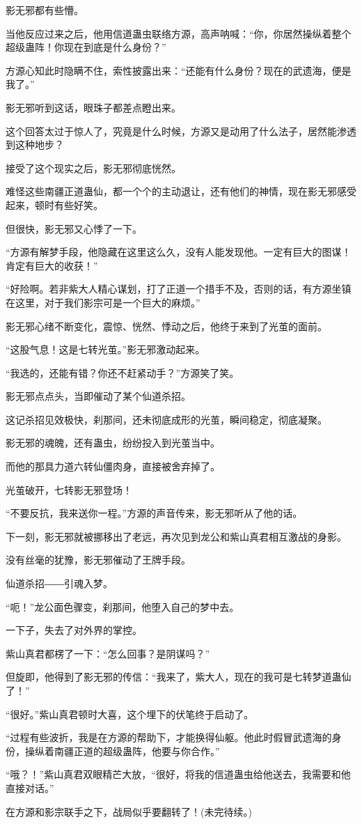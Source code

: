 \begin{this_body}
影无邪都有些懵。

当他反应过来之后，他用信道蛊虫联络方源，高声呐喊：“你，你居然操纵着整个超级蛊阵！你现在到底是什么身份？”

方源心知此时隐瞒不住，索性披露出来：“还能有什么身份？现在的武遗海，便是我了。”

影无邪听到这话，眼珠子都差点瞪出来。

这个回答太过于惊人了，究竟是什么时候，方源又是动用了什么法子，居然能渗透到这种地步？

接受了这个现实之后，影无邪彻底恍然。

难怪这些南疆正道蛊仙，都一个个的主动退让，还有他们的神情，现在影无邪感受起来，顿时有些好笑。

但很快，影无邪又心悸了一下。

“方源有解梦手段，他隐藏在这里这么久，没有人能发现他。一定有巨大的图谋！肯定有巨大的收获！”

“好险啊。若非紫大人精心谋划，打了正道一个措手不及，否则的话，有方源坐镇在这里，对于我们影宗可是一个巨大的麻烦。”

影无邪心绪不断变化，震惊、恍然、悸动之后，他终于来到了光茧的面前。

“这股气息！这是七转光茧。”影无邪激动起来。

“我选的，还能有错？你还不赶紧动手？”方源笑了笑。

影无邪点点头，当即催动了某个仙道杀招。

这记杀招见效极快，刹那间，还未彻底成形的光茧，瞬间稳定，彻底凝聚。

影无邪的魂魄，还有蛊虫，纷纷投入到光茧当中。

而他的那具力道六转仙僵肉身，直接被舍弃掉了。

光茧破开，七转影无邪登场！

“不要反抗，我来送你一程。”方源的声音传来，影无邪听从了他的话。

下一刻，影无邪就被挪移出了老远，再次见到龙公和紫山真君相互激战的身影。

没有丝毫的犹豫，影无邪催动了王牌手段。

仙道杀招――引魂入梦。

“呃！”龙公面色骤变，刹那间，他堕入自己的梦中去。

一下子，失去了对外界的掌控。

紫山真君都楞了一下：“怎么回事？是阴谋吗？”

但旋即，他得到了影无邪的传信：“我来了，紫大人，现在的我可是七转梦道蛊仙了！”

“很好。”紫山真君顿时大喜，这个埋下的伏笔终于启动了。

“过程有些波折，我是在方源的帮助下，才能换得仙躯。他此时假冒武遗海的身份，操纵着南疆正道的超级蛊阵，他要与你合作。”

“哦？！”紫山真君双眼精芒大放，“很好，将我的信道蛊虫给他送去，我需要和他直接对话。”

在方源和影宗联手之下，战局似乎要翻转了！(未完待续。)

\end{this_body}

